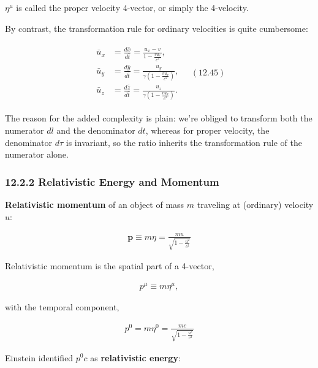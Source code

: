 \documentclass[11pt,letterpaper]{book}
\newcommand{\bm}[1]{\boldsymbol{#1}}
\begin{document}
        \(\eta^\mu\) is called the proper velocity 4-vector, or simply the 4-velocity.
        
        By contrast, the transformation rule for ordinary velocities is quite cumbersome:
        
        \begin{align}
        \begin{aligned}
        \bar{u}_x &= \frac{d\bar{x}}{d\bar{t}} = \frac{u_x - v}{1 - \frac{vu_x}{c^2}}, \\
        \bar{u}_y &= \frac{d\bar{y}}{d\bar{t}} = \frac{u_y}{\gamma \left(1 - \frac{vu_x}{c^2}\right)}, \\
        \bar{u}_z &= \frac{d\bar{z}}{d\bar{t}} = \frac{u_z}{\gamma \left(1 - \frac{vu_x}{c^2}\right)}.
        \end{aligned} \quad (12.45)
        \end{align}
        
        The reason for the added complexity is plain: we’re obliged to transform both the numerator \(dl\) and the denominator \(dt\), whereas for proper velocity, the denominator \(d\tau\) is invariant, so the ratio inherits the transformation rule of the numerator
        alone.
        
    \subsubsection{12.2.2 Relativistic Energy and Momentum}
        \textbf{Relativistic momentum} of an object of mass \(m\) traveling at (ordinary) velocity \(u\):
        
        \begin{align}
        \bm{p} \equiv m\eta = \frac{mu}{\sqrt{1 - \frac{u^2}{c^2}}}
        \end{align}
        
        Relativistic momentum is the spatial part of a 4-vector,
        
        \begin{align}
        p^\mu \equiv m\eta^\mu,
        \end{align}
        
        with the temporal component,
        
        \begin{align}
        p^0 = m\eta^0 = \frac{mc}{\sqrt{1 - \frac{u^2}{c^2}}}
        \end{align}
        
        Einstein identified \(p^0c\) as \textbf{relativistic energy}:
        
\end{document}
